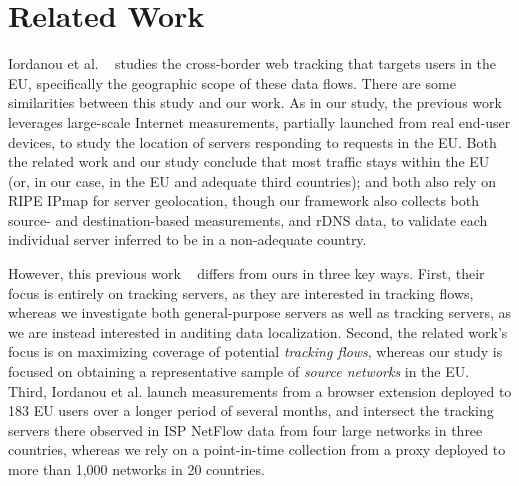 \section{Related Work}
\label{sec:related}

Iordanou et al. ~\cite{10.1145/3278532.3278561} studies the
cross-border web tracking that targets users in the EU,
specifically the geographic scope of these data flows.
There are some similarities between this study and our work.
As in our study,
the previous work leverages large-scale Internet measurements,
partially launched from real end-user devices,
to study the location of servers responding to requests in the EU.
Both the related work and our study conclude that 
most traffic stays within the EU (or, in our case,
in the EU and adequate third countries); and
both also rely on RIPE IPmap for server geolocation, though our
framework also collects both source- and destination-based
measurements, and rDNS data, to validate each individual server inferred to be 
in a non-adequate country.

However, this previous work ~\cite{10.1145/3278532.3278561} differs from ours
in three key ways.
First, their focus is entirely on 
tracking servers, as they are interested in tracking flows, whereas we
investigate both general-purpose servers as well as tracking servers,
as we are instead interested in auditing data localization.
Second, the related work's
focus is on maximizing coverage of potential \textit{tracking flows},
whereas our study is focused on obtaining a representative
sample of \textit{source networks} in the EU. Third,
Iordanou et al. launch measurements from a browser
extension deployed to 183 EU users over a longer
period of several months, and intersect the
tracking servers there observed in ISP NetFlow data from
four large networks in three countries, whereas we rely 
on a point-in-time collection from a proxy deployed to more than 1,000 networks
in 20 countries.


